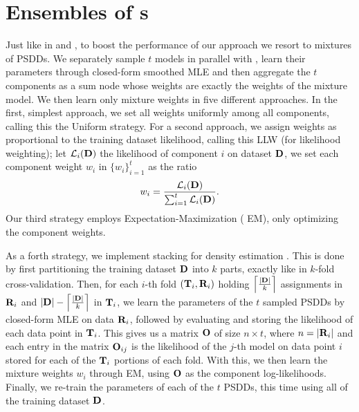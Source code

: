 \section{Ensembles of s}

Just like in  and , to boost the performance of our approach
we resort to mixtures of PSDDs. We separately sample $t$ models in parallel with
, learn their parameters through closed-form smoothed MLE \citep{kisa14} and
then aggregate the $t$ components as a sum node whose weights are exactly the weights of the
mixture model. We then learn only mixture weights in five different approaches. In the first,
simplest approach, we set all weights uniformly among all components, calling this the
 Uniform strategy. For a second approach, we assign weights as proportional to
the training dataset likelihood, calling this  LLW (for likelihood weighting);
let $\mathcal{L}_i(\mathbf{D})$ the likelihood of component $i$ on dataset $\mathbf{D}$, we set each
component weight $w_i$ in $\{w_i\}_{i=1}^t$ as the ratio
\begin{equation}
  w_i=\frac{\mathcal{L}_i(\mathbf{D})}{\sum_{i=1}^t\mathcal{L}_i(\mathbf{D})}.
\end{equation}
Our third strategy employs Expectation-Maximization ( EM), only optimizing the
component weights.


As a forth strategy, we implement stacking for density estimation \citep{smyth98}. This is done by
first partitioning the training dataset $\mathbf{D}$ into $k$ parts, exactly like in $k$-fold
cross-validation. Then, for each $i$-th fold $(\mathbf{T}_i,\mathbf{R}_i)$ holding
$\left\lceil\frac{|\mathbf{D}|}{k}\right\rceil$ assignments in $\mathbf{R}_i$ and
$|\mathbf{D}|-\left\lceil\frac{|\mathbf{D}|}{k}\right\rceil$ in $\mathbf{T}_i$, we learn the parameters of
the $t$ sampled PSDDs by closed-form MLE on data $\mathbf{R}_i$, followed by evaluating and storing
the likelihood of each data point in $\mathbf{T}_i$. This gives us a matrix $\mathbf{O}$ of size $n\times
t$, where $n=|\mathbf{R}_i|$ and each entry in the matrix $\mathbf{O}_{ij}$ is the likelihood of the
$j$-th model on data point $i$ stored for each of the $\mathbf{T}_i$ portions of each fold. With this,
we then learn the mixture weights $w_i$ through EM, using $\mathbf{O}$ as the component
log-likelihoods. Finally, we re-train the parameters of each of the $t$ PSDDs, this time using all
of the training dataset $\mathbf{D}$.

